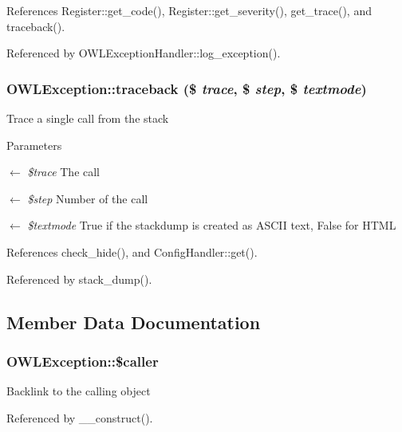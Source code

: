 References Register::get\_\-code(), Register::get\_\-severity(), get\_\-trace(), and traceback().



Referenced by OWLExceptionHandler::log\_\-exception().

\subsubsection[{traceback}]{\setlength{\rightskip}{0pt plus 5cm}OWLException::traceback (\$ {\em trace}, \/  \$ {\em step}, \/  \$ {\em textmode})}\label{classOWLException_a6e857cc079ee29428791e4926fe1677a}
Trace a single call from the stack


\begin{DoxyParams}{Parameters}
\item[\mbox{$\leftarrow$} {\em \$trace}]The call \item[\mbox{$\leftarrow$} {\em \$step}]Number of the call \item[\mbox{$\leftarrow$} {\em \$textmode}]True if the stackdump is created as ASCII text, False for HTML \end{DoxyParams}


References check\_\-hide(), and ConfigHandler::get().



Referenced by stack\_\-dump().



\subsection{Member Data Documentation}
\subsubsection[{\$caller}]{\setlength{\rightskip}{0pt plus 5cm}OWLException::\$caller}\label{classOWLException_af59d0890c1de1187f43084ec617545f1}
Backlink to the calling object 

Referenced by \_\-\_\-construct().

